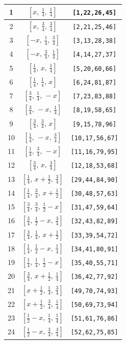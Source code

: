 \documentclass[fleqn,8pt]{jsarticle}
\begin{document}
\begin{longtable}{ccc}
1 & $\left[ x,\, \frac{1}{4},\, \frac{1}{4} \right]$ & {\tt [1,22,26,45]} \\ \hline
2 & $\left[ x,\, \frac{3}{4},\, \frac{3}{4} \right]$ & {\tt [2,21,25,46]} \\ \hline
3 & $\left[ - x,\, \frac{1}{4},\, \frac{3}{4} \right]$ & {\tt [3,13,28,38]} \\ \hline
4 & $\left[ - x,\, \frac{3}{4},\, \frac{1}{4} \right]$ & {\tt [4,14,27,37]} \\ \hline
5 & $\left[ \frac{1}{4},\, x,\, \frac{1}{4} \right]$ & {\tt [5,20,60,66]} \\ \hline
6 & $\left[ \frac{1}{4},\, \frac{1}{4},\, x \right]$ & {\tt [6,24,81,87]} \\ \hline
7 & $\left[ \frac{3}{4},\, \frac{1}{4},\, - x \right]$ & {\tt [7,23,83,88]} \\ \hline
8 & $\left[ \frac{3}{4},\, - x,\, \frac{1}{4} \right]$ & {\tt [8,19,58,65]} \\ \hline
9 & $\left[ \frac{3}{4},\, \frac{3}{4},\, x \right]$ & {\tt [9,15,78,96]} \\ \hline
10 & $\left[ \frac{1}{4},\, - x,\, \frac{3}{4} \right]$ & {\tt [10,17,56,67]} \\ \hline
11 & $\left[ \frac{1}{4},\, \frac{3}{4},\, - x \right]$ & {\tt [11,16,79,95]} \\ \hline
12 & $\left[ \frac{3}{4},\, x,\, \frac{3}{4} \right]$ & {\tt [12,18,53,68]} \\ \hline
13 & $\left[ \frac{1}{4},\, x + \frac{1}{2},\, \frac{3}{4} \right]$ & {\tt [29,44,84,90]} \\ \hline
14 & $\left[ \frac{1}{4},\, \frac{3}{4},\, x + \frac{1}{2} \right]$ & {\tt [30,48,57,63]} \\ \hline
15 & $\left[ \frac{3}{4},\, \frac{3}{4},\, \frac{1}{2} - x \right]$ & {\tt [31,47,59,64]} \\ \hline
16 & $\left[ \frac{3}{4},\, \frac{1}{2} - x,\, \frac{3}{4} \right]$ & {\tt [32,43,82,89]} \\ \hline
17 & $\left[ \frac{3}{4},\, \frac{1}{4},\, x + \frac{1}{2} \right]$ & {\tt [33,39,54,72]} \\ \hline
18 & $\left[ \frac{1}{4},\, \frac{1}{2} - x,\, \frac{1}{4} \right]$ & {\tt [34,41,80,91]} \\ \hline
19 & $\left[ \frac{1}{4},\, \frac{1}{4},\, \frac{1}{2} - x \right]$ & {\tt [35,40,55,71]} \\ \hline
20 & $\left[ \frac{3}{4},\, x + \frac{1}{2},\, \frac{1}{4} \right]$ & {\tt [36,42,77,92]} \\ \hline
21 & $\left[ x + \frac{1}{2},\, \frac{1}{4},\, \frac{3}{4} \right]$ & {\tt [49,70,74,93]} \\ \hline
22 & $\left[ x + \frac{1}{2},\, \frac{3}{4},\, \frac{1}{4} \right]$ & {\tt [50,69,73,94]} \\ \hline
23 & $\left[ \frac{1}{2} - x,\, \frac{1}{4},\, \frac{1}{4} \right]$ & {\tt [51,61,76,86]} \\ \hline
24 & $\left[ \frac{1}{2} - x,\, \frac{3}{4},\, \frac{3}{4} \right]$ & {\tt [52,62,75,85]} \\
\end{longtable}
\end{document}
